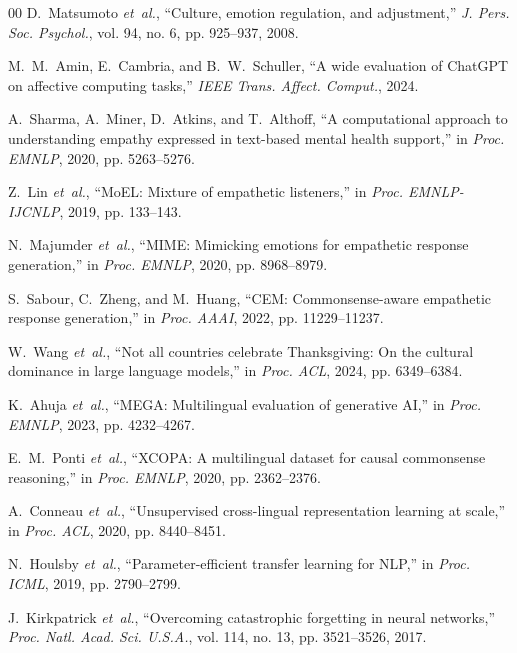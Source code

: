 \documentclass[journal]{IEEEtran}
\begin{document}
\begin{thebibliography}{00}
D.~Matsumoto \textit{et~al.}, ``Culture, emotion regulation, and adjustment,'' \textit{J. Pers. Soc. Psychol.}, vol. 94, no. 6, pp. 925--937, 2008.

M.~M.~Amin, E.~Cambria, and B.~W.~Schuller, ``A wide evaluation of ChatGPT on affective computing tasks,'' \textit{IEEE Trans. Affect. Comput.}, 2024.


A.~Sharma, A.~Miner, D.~Atkins, and T.~Althoff, ``A computational approach to understanding empathy expressed in text-based mental health support,'' in \textit{Proc. EMNLP}, 2020, pp. 5263--5276.

Z.~Lin \textit{et~al.}, ``MoEL: Mixture of empathetic listeners,'' in \textit{Proc. EMNLP-IJCNLP}, 2019, pp. 133--143.

N.~Majumder \textit{et~al.}, ``MIME: Mimicking emotions for empathetic response generation,'' in \textit{Proc. EMNLP}, 2020, pp. 8968--8979.

S.~Sabour, C.~Zheng, and M.~Huang, ``CEM: Commonsense-aware empathetic response generation,'' in \textit{Proc. AAAI}, 2022, pp. 11229--11237.

W.~Wang \textit{et~al.}, ``Not all countries celebrate Thanksgiving: On the cultural dominance in large language models,'' in \textit{Proc. ACL}, 2024, pp. 6349--6384.

K.~Ahuja \textit{et~al.}, ``MEGA: Multilingual evaluation of generative AI,'' in \textit{Proc. EMNLP}, 2023, pp. 4232--4267.

E.~M.~Ponti \textit{et~al.}, ``XCOPA: A multilingual dataset for causal commonsense reasoning,'' in \textit{Proc. EMNLP}, 2020, pp. 2362--2376.

A.~Conneau \textit{et~al.}, ``Unsupervised cross-lingual representation learning at scale,'' in \textit{Proc. ACL}, 2020, pp. 8440--8451.

N.~Houlsby \textit{et~al.}, ``Parameter-efficient transfer learning for NLP,'' in \textit{Proc. ICML}, 2019, pp. 2790--2799.

J.~Kirkpatrick \textit{et~al.}, ``Overcoming catastrophic forgetting in neural networks,'' \textit{Proc. Natl. Acad. Sci. U.S.A.}, vol. 114, no. 13, pp. 3521--3526, 2017.


\end{thebibliography}
\end{document}
